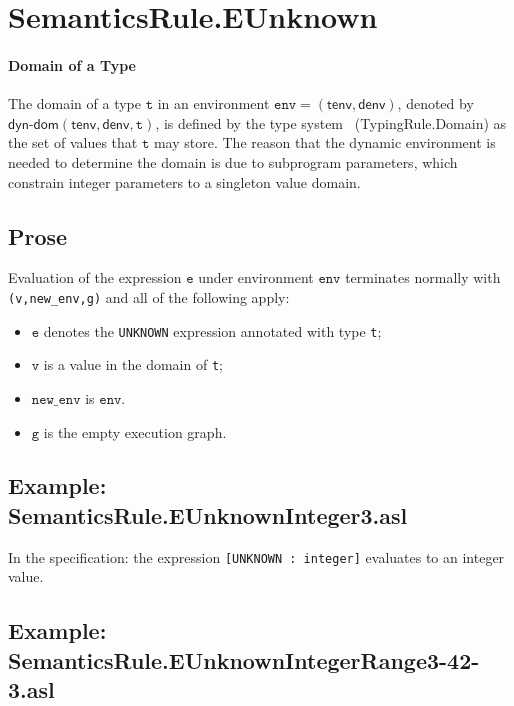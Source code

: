 \documentclass{book}
\newcommand\tenv[0]{\textsf{tenv}}
\newcommand\denv[0]{\textsf{denv}}
\newcommand\newenv[0]{\texttt{new\_env}}
\newcommand\env[0]{\texttt{env}}
\newcommand\ve[0]{\texttt{e}}
\newcommand\vg[0]{\texttt{g}}
\newcommand\vv[0]{\texttt{v}}
\newcommand\vt[0]{\texttt{t}}
\begin{document}

\section{SemanticsRule.EUnknown \label{sec:SemanticsRule.EUnknown}}

  \paragraph{Domain of a Type}

  The domain of a type $\vt$ in an environment $\env=(\tenv,\denv)$,
  denoted by $\textsf{dyn-dom}(\tenv, \denv, \vt)$, is defined by the type system~\cite{ASLTypingReference}
  (TypingRule.Domain)
  as the set of values that $\vt$ may store. The reason that the dynamic environment is
  needed to determine the domain is due to subprogram parameters, which constrain integer parameters to
  a singleton value domain.

  \subsection{Prose}
  Evaluation of the expression $\ve$ under environment $\env$ terminates normally with
  \texttt{(v,new\_env,g)} and all of the following apply:
  \begin{itemize}
  \item $\ve$ denotes the \texttt{UNKNOWN} expression annotated with type \texttt{t};
  \item $\vv$ is a value in the domain of \texttt{t};
  \item $\newenv$ is $\env$.
  \item $\vg$ is the empty execution graph.
  \end{itemize}

  \subsection{Example: SemanticsRule.EUnknownInteger3.asl}
    In the specification:
    the expression \texttt{[UNKNOWN : integer]} evaluates to an integer value.

  \subsection{Example: \\ SemanticsRule.EUnknownIntegerRange3-42-3.asl}
\end{document}
